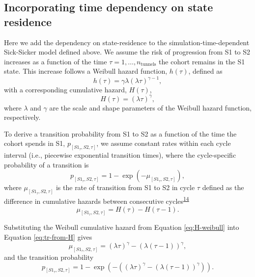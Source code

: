 \documentclass[
]{article}
\begin{document}
\hypertarget{incorporating-time-dependency-on-state-residence}{%
\subsection{Incorporating time dependency on state residence}\label{incorporating-time-dependency-on-state-residence}}

Here we add the dependency on state-residence to the simulation-time-dependent Sick-Sicker model defined above. We assume the risk of progression from S1 to S2 increases as a function of the time \(\tau = 1, \ldots, n_{\text{tunnels}}\) the cohort remains in the S1 state. This increase follows a Weibull hazard function, \(h(\tau)\), defined as
\[
  h(\tau) = \gamma \lambda (\lambda \tau)^{\gamma-1},
\]
with a corresponding cumulative hazard, \(H(\tau)\),
\begin{equation}
  H(\tau) = (\lambda \tau)^{\gamma},
\label{eq:H-weibull}
\end{equation}
where \(\lambda\) and \(\gamma\) are the scale and shape parameters of the Weibull hazard function, respectively.

To derive a transition probability from S1 to S2 as a function of the time the cohort spends in S1, \(p_{\left[S1_{\tau},S2, \tau\right]}\), we assume constant rates within each cycle interval (i.e., piecewise exponential transition times), where the cycle-specific probability of a transition is
\begin{equation}
  p_{\left[S1_{\tau},S2, \tau\right]} = 1-\exp{\left(-\mu_{\left[S1_{\tau},S2, \tau\right]}\right)},
\label{eq:tp-from-rate}
\end{equation}
where \(\mu_{\left[S1_{\tau},S2, \tau\right]}\) is the rate of transition from S1 to S2 in cycle \(\tau\) defined as the difference in cumulative hazards between consecutive cycles\textsuperscript{\protect\hyperlink{ref-Diaby2014}{14}}
\begin{equation}
  \mu_{\left[S1_{\tau},S2, \tau\right]} = H(\tau) - H(\tau-1).
\label{eq:tr-from-H}
\end{equation}

Substituting the Weibull cumulative hazard from Equation \eqref{eq:H-weibull} into Equation \eqref{eq:tr-from-H} gives
\begin{equation}
  \mu_{\left[S1_{\tau},S2, \tau\right]} = (\lambda \tau)^{\gamma} - (\lambda (\tau-1))^{\gamma},
\label{eq:tr-from-H-weibull}
\end{equation}
and the transition probability
\begin{equation}
  p_{\left[S1_{\tau},S2, \tau\right]} = 1-\exp{\left(- \left((\lambda \tau)^{\gamma} - (\lambda (\tau-1))^{\gamma}\right) \right)}.
\label{eq:tp-from-H-weibull}
\end{equation}
\end{document}
